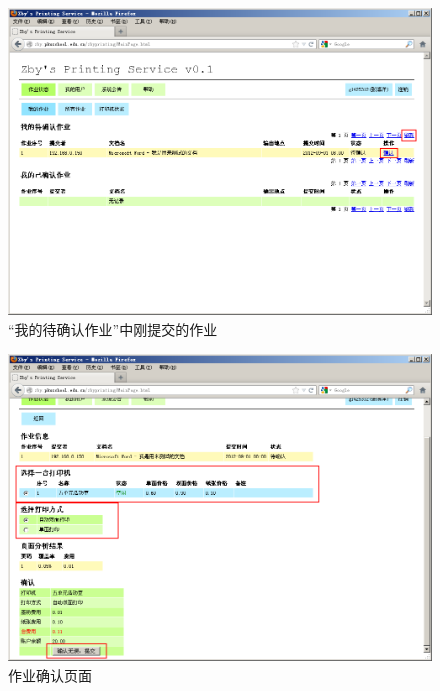 \documentclass{article}
\begin{document}
\begin{CJK}{UTF8}{gbsn}
			\begin{figure}[hp]
				\centering
				\includegraphics[height=0.45\textheight]{jobconfirm1.png}
				\caption{``我的待确认作业''中刚提交的作业}
				\label{fig:jobconfirm1}
			\end{figure}
			\begin{figure}[hp]
				\centering
				\includegraphics[height=0.45\textheight]{jobconfirm2.png}
				\caption{作业确认页面}
				\label{fig:jobconfirm2}
			\end{figure}
			\begin{figure}[hp]
				\centering

\end{figure}
\end{CJK}
\end{document}
